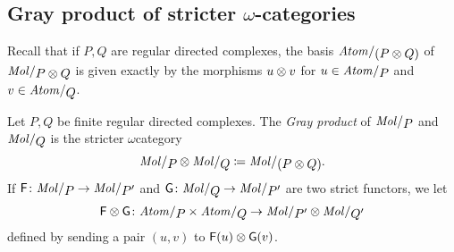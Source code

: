 \subsection{Gray product of stricter \texorpdfstring{$\omega$}{ω}-categories}

Recall that if \( P, Q \) are regular directed complexes, the basis \( \atomin{(P \gray Q)} \) of \( \molecin{P \gray Q} \) is given exactly by the morphisms \( u \otimes v \) for \( u \in \atomin{P} \) and \( v \in \atomin{Q} \).  

\begin{dfn}  \label{dfn:gray_product_of_stricter_regular_complexes}
    Let \( P, Q \) be finite regular directed complexes.
    The \emph{Gray product} of \( \molecin{P} \) and \( \molecin{Q} \) is the stricter \( \omega \)\nbd category
    \begin{equation*}
        \molecin{P} \gray \molecin{Q} \eqdef \molecin{(P \gray Q)}.
    \end{equation*}
    If \( \F \colon \molecin{P} \to \molecin{P'} \) and \( \G \colon \molecin{Q} \to \molecin{P'} \) are two strict functors, we let 
    \begin{equation*}
        \F \gray \G \colon \atomin{P} \times \atomin{Q} \to  \molecin{P'} \gray \molecin{Q'}
    \end{equation*}
    defined by sending a pair \( (u, v) \) to \( \mathsf{F}(u) \otimes \mathsf{G}(v) \).
\end{dfn}

